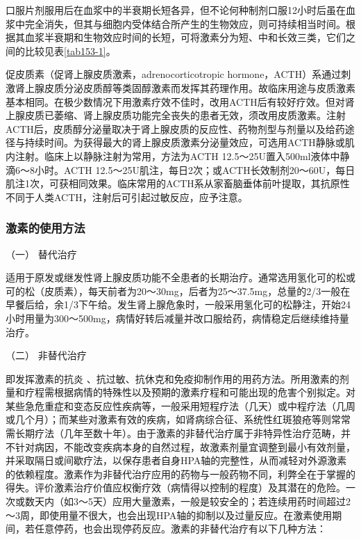 口服片剂服用后在血浆中的半衰期长短各异，但不论何种制剂口服12小时后虽在血浆中完全消失，但其与细胞内受体结合所产生的生物效应，则可持续相当时间。根据其血浆半衰期和生物效应时间的长短，可将激素分为短、中和长效三类，它们之间的比较见表\ref{tab153-1}。

促皮质素（促肾上腺皮质激素，adrenocorticotropic
hormone，ACTH）系通过刺激肾上腺皮质分泌皮质醇等类固醇激素而发挥其药理作用。故临床用途与皮质激素基本相同。在极少数情况下用激素疗效不佳时，改用ACTH后有较好疗效。但对肾上腺皮质已萎缩、肾上腺皮质功能完全丧失的患者无效，须改用皮质激素。注射ACTH后，皮质醇分泌量取决于肾上腺皮质的反应性、药物剂型与剂量以及给药途径与持续时间。为获得最大的肾上腺皮质激素分泌量效应，可选用ACTH静脉或肌内注射。临床上以静脉注射为常用，方法为ACTH
12.5～25U置入500ml液体中静滴6～8小时。ACTH
12.5～25U肌注，每日2次；或ACTH长效制剂20～60U，每日肌注1次，可获相同效果。临床常用的ACTH系从家畜脑垂体前叶提取，其抗原性不同于人类ACTH，注射后可引起过敏反应，应予注意。

\subsubsection{激素的使用方法}

\hypertarget{text00428.htmlux5cux23CHP17-6-4-1}{}
（一） 替代治疗

适用于原发或继发性肾上腺皮质功能不全患者的长期治疗。通常选用氢化可的松或可的松（皮质素），每天前者为20～30mg，后者为25～37.5mg，总量的2/3一般在早餐后给，余1/3下午给。发生肾上腺危象时，一般采用氢化可的松静注，开始24小时用量为300～500mg，病情好转后减量并改口服给药，病情稳定后继续维持量治疗。

\hypertarget{text00428.htmlux5cux23CHP17-6-4-2}{}
（二） 非替代治疗

即发挥激素的抗炎
、抗过敏、抗休克和免疫抑制作用的用药方法。所用激素的剂量和疗程需根据病情的特殊性以及预期的激素疗程和可能出现的危害个别拟定。对某些急危重症和变态反应性疾病等，一般采用短程疗法（几天）或中程疗法（几周或几个月）；而某些对激素有效的疾病，如肾病综合征、系统性红斑狼疮等则常常需长期疗法（几年至数十年）。由于激素的非替代治疗属于非特异性治疗范畴，并不针对病因，不能改变疾病本身的自然过程，故激素剂量宜调整到最小有效剂量，并采取隔日或间歇疗法，以保存患者自身HPA轴的完整性，从而减轻对外源激素的依赖程度。激素作为非替代治疗应用的药物与一般药物不同，利弊全在于掌握的得失。评价激素治疗价值应权衡疗效（病情得以控制的程度）及其潜在的危险。一次或数天内（如3～5天）应用大量激素，一般是较安全的；若连续用药时间超过2～3周，即使用量不很大，也会出现HPA轴的抑制以及过量反应。在激素使用期间，若任意停药，也会出现停药反应。激素的非替代治疗有以下几种方法：

